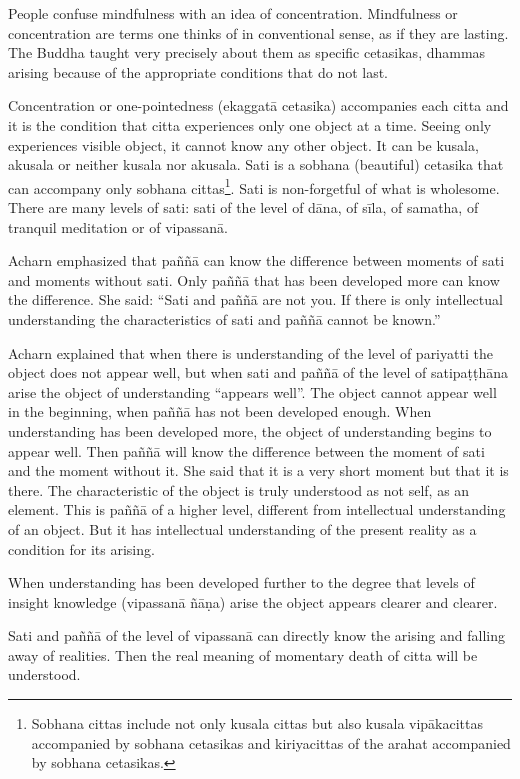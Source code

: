 People confuse mindfulness with an idea of concentration. Mindfulness or
concentration are terms one thinks of in conventional sense, as if they
are lasting. The Buddha taught very precisely about them as specific
cetasikas, dhammas arising because of the appropriate conditions that do
not last.

Concentration or one-pointedness (ekaggatā cetasika) accompanies each
citta and it is the condition that citta experiences only one object at
a time. Seeing only experiences visible object, it cannot know any other
object. It can be kusala, akusala or neither kusala nor akusala. Sati is
a sobhana (beautiful) cetasika that can accompany only sobhana cittas\footnote{Sobhana cittas include
not only kusala cittas but also kusala vipākacittas accompanied by
sobhana cetasikas and kiriyacittas of the arahat accompanied by sobhana
cetasikas.}. Sati is non-forgetful of
what is wholesome. There are many levels of sati: sati of the level of
dāna, of sīla, of samatha, of tranquil meditation or of vipassanā.

Acharn emphasized that paññā can know the difference between moments of
sati and moments without sati. Only paññā that has been developed more
can know the difference. She said: ``Sati and paññā are not you. If
there is only intellectual understanding the characteristics of sati and
paññā cannot be known.''

Acharn explained that when there is understanding of the level of
pariyatti the object does not appear well, but when sati and paññā of
the level of satipaṭṭhāna arise the object of understanding ``appears
well''. The object cannot appear well in the beginning, when paññā has
not been developed enough. When understanding has been developed more,
the object of understanding begins to appear well. Then paññā will know
the difference between the moment of sati and the moment without it. She
said that it is a very short moment but that it is there. The
characteristic of the object is truly understood as not self, as an
element. This is paññā of a higher level, different from intellectual
understanding of an object. But it has intellectual understanding of the
present reality as a condition for its arising.

When understanding has been developed further to the degree that levels
of insight knowledge (vipassanā ñāṇa) arise the object appears clearer
and clearer.

Sati and paññā of the level of vipassanā can directly know the arising
and falling away of realities. Then the real meaning of momentary death
of citta will be understood.

